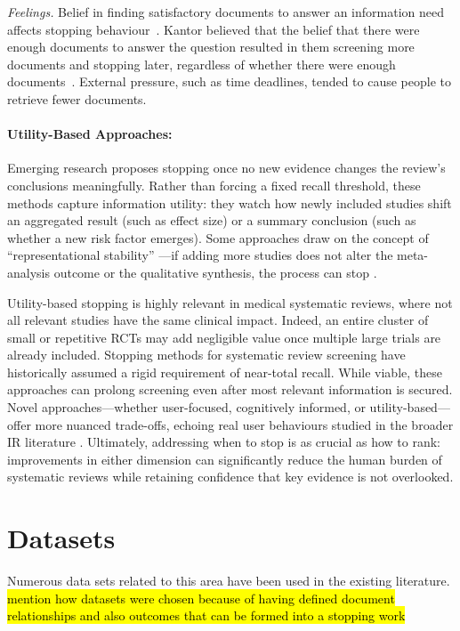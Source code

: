 \documentclass[10pt,oneside]{book}
\begin{document}
\emph{Feelings.} Belief in finding satisfactory documents to answer an information need affects stopping behaviour~\cite{wu_online_2014}. Kantor believed that the belief that there were enough documents to answer the question resulted in them screening more documents and stopping later, regardless of whether there were enough documents~\cite{kantor_model_1987}. External pressure, such as time deadlines, tended to cause people to retrieve fewer documents. 


\paragraph{Utility-Based Approaches: } 
Emerging research proposes stopping once no new evidence changes the review’s conclusions meaningfully. Rather than forcing a fixed recall threshold, these methods capture information utility: they watch how newly included studies shift an aggregated result (such as effect size) or a summary conclusion (such as whether a new risk factor emerges). Some approaches draw on the concept of “representational stability” \cite{nickles_judgment-based_1995}—if adding more studies does not alter the meta-analysis outcome or the qualitative synthesis, the process can stop \cite{ilani_analysis_2024}.

Utility-based stopping is highly relevant in medical systematic reviews, where not all relevant studies have the same clinical impact. Indeed, an entire cluster of small or repetitive RCTs may add negligible value once multiple large trials are already included. Stopping methods for systematic review screening have historically assumed a rigid requirement of near-total recall. While viable, these approaches can prolong screening even after most relevant information is secured. Novel approaches—whether user-focused, cognitively informed, or utility-based—offer more nuanced trade-offs, echoing real user behaviours studied in the broader IR literature \cite{browne_stopping_2005, ilani_analysis_2024}. Ultimately, addressing when to stop is as crucial as how to rank: improvements in either dimension can significantly reduce the human burden of systematic reviews while retaining confidence that key evidence is not overlooked.


\newpage
\section{Datasets}

Numerous data sets related to this area have been used in the existing literature.
\hl{mention how datasets were chosen because of having defined document relationships and also outcomes that can be formed into a stopping work}
\end{document}
